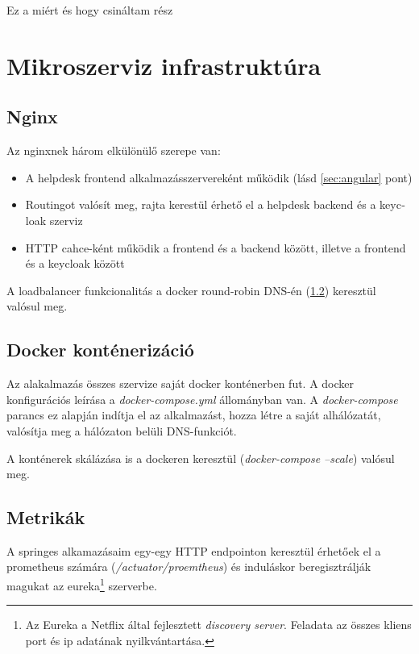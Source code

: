 Ez a miért és hogy csináltam rész

\section{Mikroszerviz infrastruktúra}
\subsection{Nginx}\label{sec:nginx}
Az nginxnek három elkülönülő szerepe van:

\begin{itemize}
	\item{A \foreignlanguage{british}{helpdesk frontend} alkalmazásszervereként működik (lásd \ref{sec:angular} pont)}
	
	\item{\foreignlanguage{british}{Routing}ot valósít meg, rajta kerestül érhető el a \foreignlanguage{british}{helpdesk backend} és a \foreignlanguage{british}{keycloak} szerviz}
	
	\item{\foreignlanguage{british}{HTTP cahce}-ként működik a frontend és a backend között, illetve a frontend és a keycloak között}
\end{itemize}

A loadbalancer funkcionalitás a \foreignlanguage{british}{docker round-robin DNS}-én (\ref{sec:docker}) keresztül valósul meg.


\subsection{Docker konténerizáció}\label{sec:docker}
Az alakalmazás összes szervize saját docker konténerben fut. A docker konfigurációs leírása a \textit{docker-compose.yml} állományban van. A \textit{docker-compose} parancs ez alapján indítja el az alkalmazást, hozza létre a saját alhálózatát, valósítja meg a hálózaton belüli DNS-funkciót.

A konténerek skálázása  is a dockeren keresztül (\textit{docker-compose --scale}) valósul meg.



\subsection{Metrikák}
A springes alkamazásaim egy-egy HTTP endpointon keresztül érhetőek el a prometheus számára (\textit{\mbox{/actuator/proemtheus}}) és induláskor beregisztrálják magukat az eureka\footnote{Az Eureka a Netflix által fejlesztett \textit{discovery server}. Feladata az összes kliens port és ip adatának nyilkvántartása.} szerverbe.

